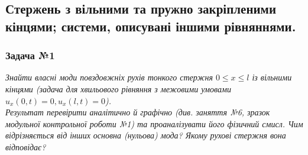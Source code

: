 \subsection{Стержень з вільними та пружно закріпленими кінцями; системи, описувані іншими рівняннями.}

\subsubsection{Задача №1}

\textit{Знайти власні моди повздовжніх рухів тонкого стержня $0 \leq x \leq l$ із вільними кінцями  (задача для хвильового рівняння з межовими умовами $u_x(0,t) = 0, u_x(l,t) = 0$).\\
Результат перевірити аналітично й графічно (див. заняття №6, зразок модульної контрольної роботи №1) та проаналізувати його фізичний смисл. Чим відрізняється від інших основна (нульова) мода? Якому рухові стержня вона відповідає?}